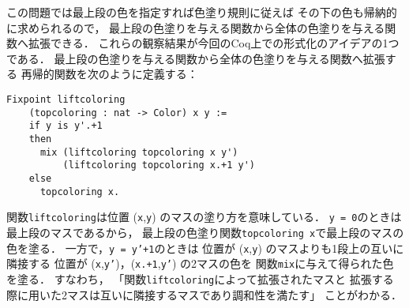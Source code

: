 

この問題では最上段の色を指定すれば色塗り規則に従えば
その下の色も帰納的に求められるので，
最上段の色塗りを与える関数から全体の色塗りを与える関数へ拡張できる．
これらの観察結果が今回のCoq上での形式化のアイデアの1つである．
最上段の色塗りを与える関数から全体の色塗りを与える関数へ拡張する
再帰的関数を次のように定義する：
\begin{lstlisting}[language=Coq]
  Fixpoint liftcoloring
    (topcoloring : nat -> Color) x y :=
    if y is y'.+1
    then
      mix (liftcoloring topcoloring x y')
          (liftcoloring topcoloring x.+1 y')
    else
      topcoloring x.
\end{lstlisting}
関数{\tt{liftcoloring}}は位置 ({\tt{x}},{\tt{y}}) のマスの塗り方を意味している．
{\tt{y = 0}}のときは最上段のマスであるから，
最上段の色塗り関数{\tt{topcoloring x}}で最上段のマスの色を塗る．
一方で，{\tt{y = y'+1}}のときは
位置が ({\tt{x}},{\tt{y}}) のマスよりも1段上の互いに隣接する
位置が ({\tt{x}},{\tt{y'}})，({\tt{x.+1}},{\tt{y'}}) の2マスの色を
関数{\tt{mix}}に与えて得られた色を塗る．
すなわち，
「関数{\tt{liftcoloring}}によって拡張されたマスと
  拡張する際に用いた2マスは互いに隣接するマスであり調和性を満たす」
ことがわかる．

